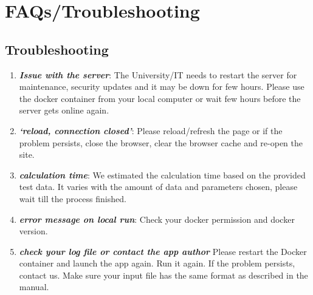 \documentclass[
  a4paper,
  oneside,
  open=any]{scrreport}
\providecommand{\tightlist}{%
  \setlength{\itemsep}{0pt}\setlength{\parskip}{0pt}}\usepackage{longtable,booktabs,array}
\begin{document}
\hypertarget{sec-faq}{%
\chapter{FAQs/Troubleshooting}\label{sec-faq}}

\hypertarget{troubleshooting}{%
\section{Troubleshooting}\label{troubleshooting}}

\begin{enumerate}
\def\labelenumi{\arabic{enumi}.}
\tightlist
\item
  \textbf{\emph{Issue with the server}}: The University/IT needs to
  restart the server for maintenance, security updates and it may be
  down for few hours. Please use the docker container from your local
  computer or wait few hours before the server gets online again.
\item
  \textbf{\emph{`reload, connection closed'}}: Please reload/refresh the
  page or if the problem persists, close the browser, clear the browser
  cache and re-open the site.
\item
  \textbf{\emph{calculation time}}: We estimated the calculation time
  based on the provided test data. It varies with the amount of data and
  parameters chosen, please wait till the process finished.
\item
  \textbf{\emph{error message on local run}}: Check your docker
  permission and docker version.
\item
  \textbf{\emph{check your log file or contact the app author}} Please
  restart the Docker container and launch the app again. Run it again.
  If the problem persists, contact us. Make sure your input file has the
  same format as described in the manual.
\end{enumerate}


\printbibliography[title=References]
\end{document}
